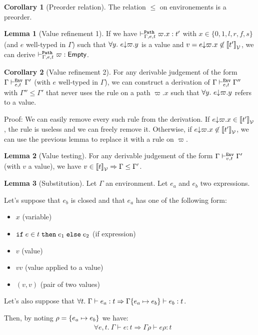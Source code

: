 \documentclass[a4paper]{article}
\theoremstyle{definition}
\newtheorem{lemma}{Lemma}
\newtheorem{corollary}{Corollary}
\begin{document}
        \begin{corollary}[Preorder relation]
          The relation $\leq$ on environements is a preorder.
        \end{corollary}

        \begin{lemma}[Value refinement 1]
          If we have $\vdash^{\texttt{Path}}_{\Gamma,e,t} \varpi.x:t'$ with $x\in\{0,1,l,r,f,s\}$ (and $e$ well-typed in $\Gamma$) such that $\forall y.\ e{\downarrow}\varpi.y$ is a value
          and $v = e{\downarrow}\varpi.x \not\in {\llbracket t' \rrbracket}_{\mathcal{V}}$, we can derive $\vdash^{\texttt{Path}}_{\Gamma,e,t} \varpi:\textsf{Empty}$.
        \end{lemma}

        \begin{corollary}[Value refinement 2]
          For any derivable judgement of the form $\Gamma \vdash^{\texttt{Env}}_{e,t} \Gamma'$ (with $e$ well-typed in $\Gamma$), we can construct a derivation of $\Gamma \vdash^{\texttt{Env}}_{e,t} \Gamma''$ with $\Gamma''\leq\Gamma'$
          that never uses the rule  on a path $\varpi.x$ such that $\forall y.\ e{\downarrow}\varpi.y$ refers to a value.
        \end{corollary}
        Proof: We can easily remove every such rule from the derivation. If $e{\downarrow}\varpi.x \in {\llbracket t' \rrbracket}_{\mathcal{V}}$, the  rule is useless
        and we can freely remove it. Otherwise, if $e{\downarrow}\varpi.x \not\in {\llbracket t' \rrbracket}_{\mathcal{V}}$, we can use the previous lemma to
        replace it with a  rule on $\varpi$.

        \begin{lemma}[Value testing]
          For any derivable judgement of the form $\Gamma \vdash^{\texttt{Env}}_{v,t} \Gamma'$ (with $v$ a value),
          we have $v \in {\llbracket t \rrbracket}_{\mathcal{V}} \Rightarrow \Gamma\leq\Gamma'$.
        \end{lemma}

        \begin{lemma}[Substitution]
          Let $\Gamma$ an environment. Let $e_a$ and $e_b$ two expressions.

          Let's suppose that $e_b$ is closed and that $e_a$ has one of the following form:
          \begin{itemize}
            \item $x$ (variable)
            \item $\texttt{if}\;e\in t\;\texttt{then}\;e_1\;\texttt{else}\;e_2$ (if expression)
            \item $v$ (value)
            \item $v v$ (value applied to a value)
            \item $(v,v)$ (pair of two values)
          \end{itemize}
          Let's also suppose that $\forall t.\ \Gamma \vdash e_a : t \Rightarrow \Gamma\{e_a \mapsto e_b\} \vdash e_b:t$.
          
          Then, by noting $\rho = \{e_a \mapsto e_b\}$ we have:
          \begin{align*}
            &\forall e,t.\ \Gamma \vdash e:t \Rightarrow \Gamma\rho \vdash e\rho:t
          \end{align*}
        \end{lemma}
\end{document}
